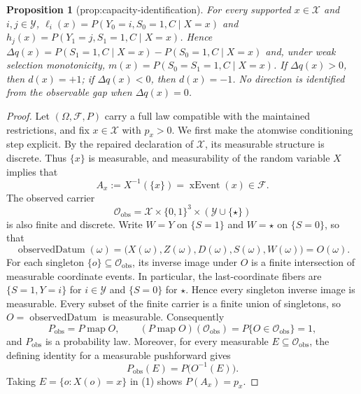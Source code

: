 \documentclass{article}
\newtheorem{proposition}{Proposition}
\begin{document}
\begin{proposition}[prop:capacity-identification]\label{prop:capacity-identification}
For every supported \(x\in\mathcal X\) and \(i,j\in\mathcal Y\), \(\ell_i(x)=P(Y_0=i,S_0=1,C\mid X=x)\) and \(h_j(x)=P(Y_1=j,S_1=1,C\mid X=x)\). Hence \(\Delta q(x)=P(S_1=1,C\mid X=x)-P(S_0=1,C\mid X=x)\) and, under weak selection monotonicity, \(m(x)=P(S_0=S_1=1,C\mid X=x)\). If \(\Delta q(x)>0\), then \(d(x)=+1\); if \(\Delta q(x)<0\), then \(d(x)=-1\). No direction is identified from the observable gap when \(\Delta q(x)=0\).
\end{proposition}
\begin{proof}
Let \((\Omega,\mathscr F,P)\) carry a full law compatible with the maintained restrictions, and fix \(x\in\mathcal X\) with \(p_x>0\).  We first make the atomwise conditioning step explicit.  By the repaired declaration of \(\mathcal X\), its measurable structure is discrete.  Thus \(\{x\}\) is measurable, and measurability of the random variable \(X\) implies that
\[
A_x:=X^{-1}(\{x\})=\operatorname{xEvent}(x)\in\mathscr F.
\]
The observed carrier
\[
\mathcal O_{\mathrm{obs}}
=\mathcal X\times\{0,1\}^{3}\times(\mathcal Y\cup\{\star\})
\]
is also finite and discrete.  Write \(W=Y\) on \(\{S=1\}\) and \(W=\star\) on \(\{S=0\}\), so that
\[
\operatorname{observedDatum}(\omega)
=\bigl(X(\omega),Z(\omega),D(\omega),S(\omega),W(\omega)\bigr)
=O(\omega).
\]
For each singleton \(\{o\}\subseteq\mathcal O_{\mathrm{obs}}\), its inverse image under \(O\) is a finite intersection of measurable coordinate events.  In particular, the last-coordinate fibers are \(\{S=1,Y=i\}\) for \(i\in\mathcal Y\) and \(\{S=0\}\) for \(\star\).  Hence every singleton inverse image is measurable.  Every subset of the finite carrier is a finite union of singletons, so \(O=\operatorname{observedDatum}\) is measurable.  Consequently
\[
P_{\mathrm{obs}}=P\mathbin{\operatorname{map}}O,
\qquad
(P\mathbin{\operatorname{map}}O)(\mathcal O_{\mathrm{obs}})
=P\{O\in\mathcal O_{\mathrm{obs}}\}=1,
\]
and \(P_{\mathrm{obs}}\) is a probability law.  Moreover, for every measurable \(E\subseteq\mathcal O_{\mathrm{obs}}\), the defining identity for a measurable pushforward gives
\[
P_{\mathrm{obs}}(E)=P\bigl(O^{-1}(E)\bigr).
\tag{1}
\]
Taking \(E=\{o:X(o)=x\}\) in (1) shows \(P(A_x)=p_x\).


\end{proof}
\end{document}
